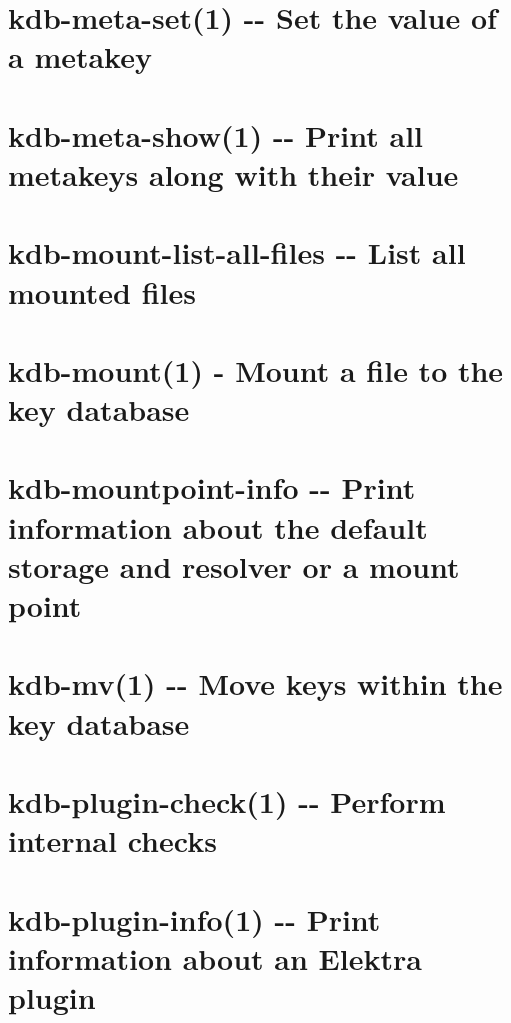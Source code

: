 \documentclass[twoside]{book}
\newcommand{\+}{\discretionary{\mbox{\scriptsize$\hookleftarrow$}}{}{}}
\begin{document}
\chapter{kdb-\/meta-\/set(1) -\/-\/ Set the value of a metakey}
\label{doc_help_kdb-meta-set_md}

\chapter{kdb-\/meta-\/show(1) -\/-\/ Print all metakeys along with their value}
\label{doc_help_kdb-meta-show_md}

\chapter{kdb-\/mount-\/list-\/all-\/files -\/-\/ List all mounted files}
\label{doc_help_kdb-mount-list-all-files_md}

\chapter{kdb-\/mount(1) -\/ Mount a file to the key database}
\label{doc_help_kdb-mount_md}

\chapter{kdb-\/mountpoint-\/info -\/-\/ Print information about the default storage and resolver or a mount point}
\label{doc_help_kdb-mountpoint-info_md}

\chapter{kdb-\/mv(1) -\/-\/ Move keys within the key database}
\label{doc_help_kdb-mv_md}

\chapter{kdb-\/plugin-\/check(1) -\/-\/ Perform internal checks}
\label{doc_help_kdb-plugin-check_md}

\chapter{kdb-\/plugin-\/info(1) -\/-\/ Print information about an Elektra plugin}
\label{doc_help_kdb-plugin-info_md}

\end{document}
